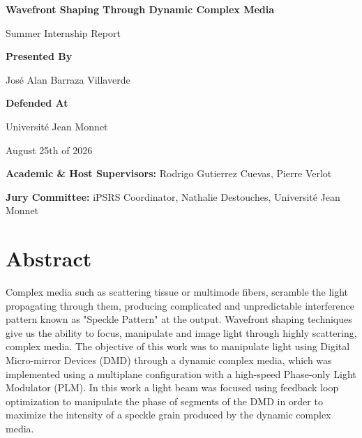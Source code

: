 \documentclass[11pt, twoside]{article}
\begin{document}
\begin{titlepage}
{\large \textbf{Wavefront Shaping Through Dynamic Complex Media}\par}
\vspace{0.15cm}
{\large Summer Internship Report \par}
\vspace{0.5cm}

{\large \textbf{Presented By}\par}
\vspace{0.15cm}
{\large Jos\'e Alan Barraza Villaverde \par}
\vspace{0.5cm}

{\large \textbf{Defended At}\par}
\vspace{0.15cm}
{\large Universit\'e Jean Monnet \par}
\vspace{0.5cm}

\vspace{1cm}

{\small August 25th of 2026 \par}

\begin{flushleft}
  \textbf{Academic \& Host Supervisors:} Rodrigo Gutierrez Cuevas, Pierre Verlot \par
  \textbf{Jury Committee:} iPSRS Coordinator, Nathalie Destouches, Universit\'e Jean Monnet \par

\end{flushleft}
\end{titlepage}

\restoregeometry

\section*{\fontsize{14}{16}\bfseries\centering Abstract}

\begin{center}%
\parbox{\textwidth}{%
\fontsize{11}{13}\normalfont
\justifying %
Complex media such as scattering tissue or multimode fibers, scramble the light propagating through them, producing complicated and unpredictable interference pattern known as "Speckle Pattern" at the output. Wavefront shaping techniques give us the ability to focus, manipulate and image light through highly scattering, complex media. The objective of this work was to manipulate light using Digital Micro-mirror Devices (DMD) through a dynamic complex media, which was implemented using a multiplane configuration with a high-speed Phase-only Light Modulator (PLM). In this work a light beam was focused using feedback loop optimization to manipulate the phase of segments of the DMD in order to maximize the intensity of a speckle grain produced by the dynamic complex media.
}
\end{center}
\end{document}
